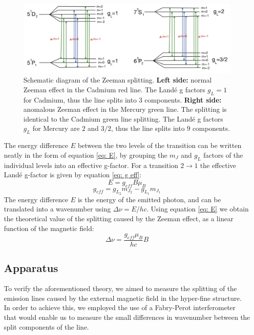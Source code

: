 \documentclass[11pt]{article}
\begin{document}
\begin{figure}[h!]
    \centering
    \includegraphics[width=\linewidth]{Energy levels.png}
    \captionsetup{justification=centering}
    \caption{Schematic diagram of the Zeeman splitting. 
    \textbf{Left side:} normal Zeeman effect in the Cadmium red line. The Landé g factors $g_L = 1$ for Cadmium, thus the line splits into 3 components. 
    \textbf{Right side:} anomalous Zeeman effect in the Mercury green line. The splitting is identical to the Cadmium green line splitting. The Landé g factors $g_L$ for Mercury are $2$ and $3/2$, thus the line splits into 9 components. }
    \label{fig: energy levels}
\end{figure}
The energy difference $E$ between the two levels of the transition can be written neatly in the form of equation \eqref{eq: E}, by grouping the $m_J$ and $g_L$ factors of the individual levels into an effective g-factor. For a transition $2 \rightarrow 1$ the effective Landé g-factor is given by equation \eqref{eq: g eff}: 
\begin{equation}
    E = g_{eff} B \mu_B \label{eq: E}
\end{equation}
\begin{equation}
    g_{eff} = g_{L_2} m_{J_2} - g_{L_1} m_{J_1} \label{eq: g eff}
\end{equation}
The energy difference $E$ is the energy of the emitted photon, and can be translated into a wavenumber using $\Delta \nu = E / hc$. Using equation \eqref{eq: E} we obtain the theoretical value of the splitting caused by the Zeeman effect, as a linear function of the magnetic field: 
\begin{equation}
    \Delta \nu = \frac{g_{eff} \mu_B}{hc} B
    \label{eq: splitting}
\end{equation}



\subsection{Apparatus} \label{sec: aparatus}
To verify the aforementioned theory, we aimed to measure the splitting of the emission lines caused by the external magnetic field in the hyper-fine structure. In order to achieve this, we employed the use of a Fabry-Perot interferometer that would enable us to measure the small differences in wavenumber between the split components of the line. 
\end{document}

